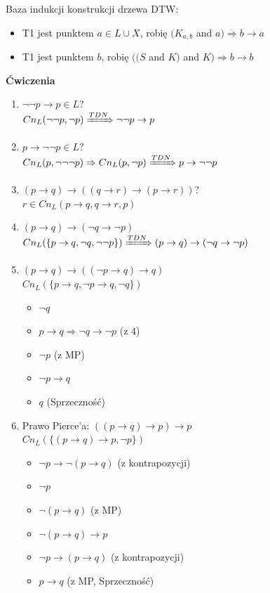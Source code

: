 \documentclass[10pt,a4paper]{article}
\theoremstyle{plain}
\theoremstyle{definition}
\newcommand{\header}[1]{\noindent\textbf{#1}}
\begin{document}
Baza indukcji konstrukcji drzewa DTW:
\begin{itemize}
\item T1 jest punktem $a \in L \cup X$, robię $(K_{a, b}$ and $a) 
\Rightarrow b \rightarrow a$
\item T1 jest punktem $b$, robię $((S$ and $K)$ and $K) 
\Rightarrow b \rightarrow b$
\end{itemize}

\newpage

\header{Ćwiczenia}
\begin{enumerate}
\item $\neg \neg p \rightarrow p \in L$?\\
$Cn_{L}(\neg \neg p, \neg p) \xRightarrow{TDN} \neg \neg p \rightarrow p$
\item $p \rightarrow \neg \neg p \in L?$\\
$Cn_{L}(p, \neg \neg \neg p) \Rightarrow Cn_{L}(p, \neg p) \xRightarrow{TDN} 
p \rightarrow \neg \neg p$
\item $(p \rightarrow q) \rightarrow 
((q \rightarrow r) \rightarrow (p \rightarrow r))$?\\
$r \in Cn_{L}({p \rightarrow q, q \rightarrow r, p})$
\item $(p \rightarrow q) \rightarrow (\neg q \rightarrow \neg p)$\\
$Cn_{L}(\{p \rightarrow q, \neg q, \neg \neg p\}) \xRightarrow{TDN} 
(p \rightarrow q) \rightarrow (\neg q \rightarrow \neg p)$
\item $(p \rightarrow q) \rightarrow ((\neg p \rightarrow q) \rightarrow q)$\\
$Cn_{L}(\{p \rightarrow q, \neg p \rightarrow q, \neg q\})$
\begin{itemize}
\item $\neg q$
\item $p \rightarrow q \Rightarrow \neg q \rightarrow \neg p$ (z 4)
\item $\neg p$ (z MP)
\item $\neg p \rightarrow q$
\item $q$ (Sprzeczność)
\end{itemize}
\item Prawo Pierce'a: $((p \rightarrow q) \rightarrow p) \rightarrow p$\\
$Cn_{L}(\{(p \rightarrow q) \rightarrow p, \neg p\})$
\begin{itemize}
\item $\neg p \rightarrow \neg (p \rightarrow q)$ (z kontrapozycji)
\item $\neg p$
\item $\neg (p \rightarrow q)$ (z MP)
\item $\neg (p \rightarrow q) \rightarrow p$
\item $\neg p \rightarrow (p \rightarrow q)$ (z kontrapozycji)
\item $p \rightarrow q$ (z MP, Sprzeczność)
\end{itemize}
\end{enumerate}
\end{document}
